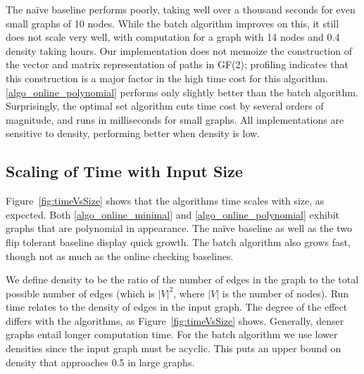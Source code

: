 \documentclass[sigplan,review,nonacm=true]{acmart}
\begin{document}
The na\"{i}ve baseline performs poorly, taking well over a thousand seconds for even small graphs of 10 nodes.
While the batch algorithm improves on this, it still does not scale very well, with computation for a graph with 14 nodes and 0.4 density taking hours.
Our implementation does not memoize the construction of the vector and matrix representation of paths in GF(2); profiling indicates that this construction is a major factor in the high time cost for this algorithm.
\ref{algo_online_polynomial} performs only slightly better than the batch algorithm.
Surprisingly, the optimal set algorithm cuts time cost by several orders of magnitude, and runs in milliseconds for small graphs.
All implementations are sensitive to density, performing better when density is low.
    
\subsection{Scaling of Time with Input Size}

Figure~\ref{fig:timeVsSize} shows that the algorithms time scales with size, as expected.
Both \ref{algo_online_minimal} and \ref{algo_online_polynomial} exhibit graphs that are polynomial in appearance.
The na\"{i}ve baseline as well as the two flip tolerant baseline display quick growth.
The batch algorithm also grows fast, though not as much as the online checking baselines.

We define density to be the ratio of the number of edges in the graph to the total possible number of edges (which is $|V|^2$, where $|V|$ is the number of nodes).
Run time relates to the density of edges in the input graph.
The degree of the effect differs with the algorithms, as Figure~\ref{fig:timeVsSize} shows.
Generally, denser graphs entail longer computation time.
For the batch algorithm we use lower densities since the input graph must be acyclic. This puts an upper bound on density that approaches 0.5 in large graphs.
\end{document}

